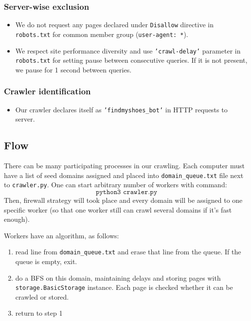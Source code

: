 \subsubsection{Server-wise exclusion}
\begin{itemize}
    \item We do not request any pages declared under  \texttt{Disallow} directive in \texttt{robots.txt} for common member group (\texttt{user-agent: *}).
    \item We respect site performance diversity and use \texttt{'crawl-delay'} parameter in \texttt{robots.txt} for setting pause between consecutive queries. If it is not present, we pause for 1 second between queries.
\end{itemize}

\subsubsection{Crawler identification}
\begin{itemize}
    \item Our crawler declares itself as \texttt{'findmyshoes\_bot'} in HTTP requests to server.
\end{itemize}

\subsection{Flow}
    There can be many participating processes in our crawling. 
    Each computer must have a list of seed domains assigned and placed into \texttt{domain\_queue.txt} file next to \texttt{crawler.py}. One can start arbitrary number of workers with command: $$\texttt{python3 crawler.py}$$
    Then, firewall strategy will took place and every domain will be assigned to one specific worker (so that one worker still can crawl several domains if it's fast enough).
    
    Workers have an algorithm, as follows:
    \begin{enumerate}
        \item read line from \texttt{domain\_queue.txt} and erase that line from the queue. If the queue is empty, exit.
    \item do a BFS on this domain, maintaining delays and stor\-ing pages with \texttt{storage.BasicStorage} instance. Each page is checked whether it can be crawled or stored.
        \item return to step 1
    \end{enumerate}

